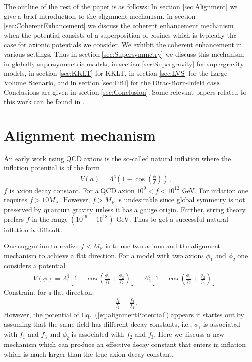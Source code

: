 \documentclass[12pt]{article}
\begin{document}
The outline of the rest of the paper is as follows: In section \ref{sec:Alignment} we give a brief introduction to the alignment mechanism.
In section \ref{sec:CoherentEnhancement} we discuss the coherent enhancement mechanism when the potential consists of a superposition of cosines which is typically the case for axionic potentials we consider.
We exhibit the coherent enhancement in various settings.
Thus in section \ref{sec:Supersymmetry} we discuss this mechanism in globally supersymmetric models, in section \ref{sec:Supergravity} for supergravity models, in section \ref{sec:KKLT} for KKLT, in section \ref{sec:LVS} for the Large Volume Scenario, and in section \ref{sec:DBI} for the Dirac-Born-Infeld case.
Conclusions are given in section \ref{sec:Conclusion}.
Some relevant papers related to this work can be found in \cite{BlancoPillado:2006he, Conlon:2005jm, Ben-Dayan:2014lca, Gao:2014uha}.

\section{Alignment mechanism \label{sec:Alignment}}
An early work using QCD axions is the so-called natural inflation where the inflation potential is of the form
\begin{align} \label{eq:naturalInflationPotential}
  V(a) = \Lambda^4 \left(1 - \cos(\frac{\phi}{f})\right)\,,
\end{align}
$f$ is axion decay constant.
For a QCD axion $10^9 < f < 10^{12}$ GeV.
For inflation one requires $f > 10 M_\text{P}$.
However, $f > M_\text{P}$ is undesirable since global symmetry is not preserved by quantum gravity unless it has a gauge origin.
Further, string theory prefers $f$ in the range $\left(10^{16} - 10^{18}\right)$ GeV.
Thus to get a successful natural inflation is difficult.

One suggestion to realize $f < M_\text{P}$ is to use two axions and the alignment mechanism to achieve a flat direction.
For a model with two axions $\phi_1$ and $\phi_2$ one considers a potential
\begin{align} \label{eq:alignmentPotential}
  V(\phi) = \Lambda^4_1 \left[1 - \cos\left(\frac{\phi_1}{f_1} + \frac{\phi_2}{f_2}\right)\right]
          + \Lambda^4_2 \left[1 - \cos\left(\frac{\phi_1}{f_3} + \frac{\phi_2}{f_4}\right)\right]\,.
\end{align}
Constraint for a flat direction:
\begin{align}
  \frac{f_1}{f_2} = \frac{f_3}{f_4}\,.
\end{align}
However, the potential of Eq.~(\ref{eq:alignmentPotential}) appears it startes out by assuming that the same field has different decay constants, i.e., $\phi_1$ is associated with $f_1$ and $f_3$ and $\phi_2$ is associated with $f_2$ and $f_3$.
Here we discuss a new mechanism which can produce an effective decay constant that enters in inflation which is much larger than the true axion decay constant.
\end{document}
